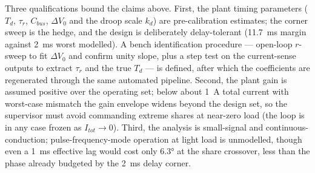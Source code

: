 Three qualifications bound the claims above. First, the plant timing parameters
($T_d$, $\tau_r$, $C_{bus}$, $\Delta V_0$ and the droop scale $k_d$) are pre-calibration
estimates; the corner sweep is the hedge, and the design is deliberately delay-tolerant
(\SI{11.7}{\milli\second} margin against \SI{2}{\milli\second} worst modelled). A bench
identification procedure --- open-loop $r$-sweep to fit $\Delta V_0$ and confirm unity
slope, plus a step test on the current-sense outputs to extract $\tau_r$ and the true
$T_d$ --- is defined, after which the coefficients are regenerated through the same
automated pipeline. Second, the plant gain is assumed positive over the operating set;
below about \SI{1}{\ampere} total current with worst-case mismatch the gain envelope
widens beyond the design set, so the supervisor must avoid commanding extreme shares at
near-zero load (the loop is in any case frozen as $I_{tot}\to 0$). Third, the analysis is
small-signal and continuous-conduction; pulse-frequency-mode operation at light load is
unmodelled, though even a \SI{1}{\milli\second} effective lag would cost only \ang{6.3} at
the share crossover, less than the phase already budgeted by the \SI{2}{\milli\second}
delay corner.

